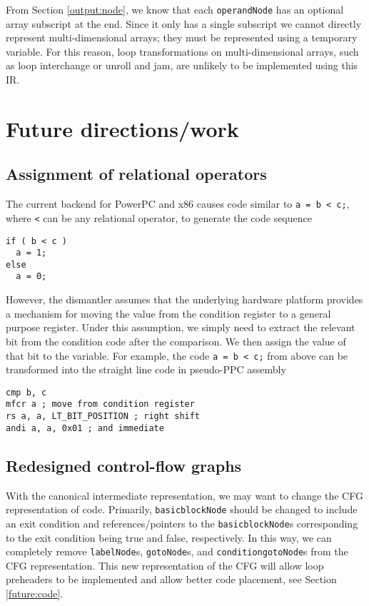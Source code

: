 \documentclass{article}
\begin{document}
From Section \ref{output:node}, we know that each \texttt{operandNode}
has an optional array subscript at the end.  Since it only has a
single subscript we cannot directly represent multi-dimensional
arrays; they must be represented using a temporary variable.  For this
reason, loop transformations on multi-dimensional arrays, such as loop
interchange or unroll and jam, are unlikely to be implemented using
this IR.

\section{\label{future} Future directions/work}

\subsection{\label{future:assign-relate} Assignment of relational operators}

The current backend for PowerPC and x86 causes code similar to 
\verb|a = b < c;|, where \texttt{<} can be any relational operator, to
generate the code sequence
\begin{verbatim}
if ( b < c )
  a = 1;
else
  a = 0;
\end{verbatim}

However, the dismantler assumes that the underlying hardware
platform provides a mechanism for moving the value from the condition
register to a general purpose register.  Under this assumption, we
simply need to extract the relevant bit from the condition code after
the comparison.  We then assign the value of that bit to the variable.
For example, the code \verb|a = b < c;| from above can be transformed
into the straight line code in pseudo-PPC assembly
\begin{verbatim}
cmp b, c
mfcr a ; move from condition register
rs a, a, LT_BIT_POSITION ; right shift
andi a, a, 0x01 ; and immediate
\end{verbatim}

\subsection{\label{future:cfg} Redesigned control-flow graphs}

With the canonical intermediate representation, we may want to change the
CFG representation of code.  Primarily, \texttt{basicblockNode} should
be changed to include an exit condition and references/pointers to the
\texttt{basicblockNode}s corresponding to the exit condition being true
and false, respectively.  In this way, we can completely remove
\texttt{labelNode}s, \texttt{gotoNode}s, and \texttt{conditiongotoNode}s
from the CFG representation.  This new representation of the CFG will
allow loop preheaders to be implemented and allow better code placement,
see Section \ref{future:code}.
\end{document}
